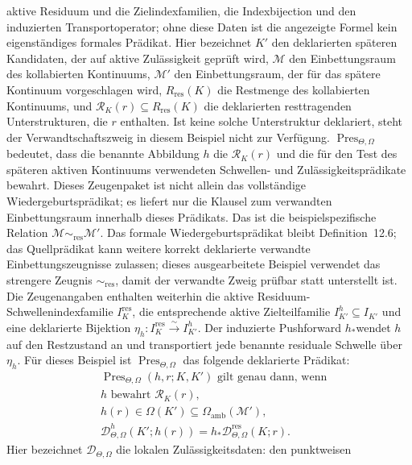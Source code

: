 aktive Residuum und die Zielindexfamilien, die Indexbijection und den induzierten Transportoperator; ohne diese
Daten ist die angezeigte Formel kein eigenständiges formales Prädikat.
Hier bezeichnet \(K'\) den deklarierten späteren Kandidaten, der auf aktive Zulässigkeit geprüft wird,
\(\mathcal{M}\) den Einbettungsraum des kollabierten Kontinuums,
\(\mathcal{M}'\) den Einbettungsraum, der für das spätere Kontinuum vorgeschlagen wird,
\(R_{\mathrm{res}}(K)\) die Restmenge des kollabierten Kontinuums, und
\(\mathcal{R}_K(r)\subseteq R_{\mathrm{res}}(K)\) die deklarierten resttragenden Unterstrukturen, die
\(r\) enthalten. Ist keine solche Unterstruktur deklariert, steht der Verwandtschaftszweig in diesem
Beispiel nicht zur Verfügung.
\(\operatorname{Pres}_{\Theta,\Omega}\) bedeutet, dass die benannte Abbildung \(h\) die
\(\mathcal{R}_K(r)\) und die für den Test des späteren aktiven Kontinuums verwendeten Schwellen- und
Zulässigkeitsprädikate bewahrt. Dieses Zeugenpaket ist nicht allein das vollständige Wiedergeburtsprädikat;
es liefert nur die Klausel zum verwandten Einbettungsraum innerhalb dieses Prädikats. Das ist die
beispielspezifische Relation
\(\mathcal{M}\sim_{\mathrm{res}}\mathcal{M}'\). Das formale Wiedergeburtsprädikat bleibt
Definition~12.6; das Quellprädikat kann weitere korrekt deklarierte verwandte Einbettungszeugnisse
zulassen; dieses ausgearbeitete Beispiel verwendet das strengere Zeugnis \(\sim_{\mathrm{res}}\), damit der
verwandte Zweig prüfbar statt unterstellt ist.
Die Zeugenangaben enthalten weiterhin die aktive Residuum-Schwellenindexfamilie
\(I_K^{\mathrm{res}}\), die entsprechende aktive Zielteilfamilie
\(I_{K'}^{h}\subseteq I_{K'}\) und eine deklarierte Bijektion
\(\eta_h:I_K^{\mathrm{res}}\xrightarrow{\sim}I_{K'}^{h}\). Der induzierte Pushforward \(h_\ast\)wendet
\(h\) auf den Restzustand an und transportiert jede benannte residuale Schwelle über \(\eta_h\).
Für dieses Beispiel ist \(\operatorname{Pres}_{\Theta,\Omega}\) das folgende deklarierte Prädikat:
\[
\begin{aligned}
&\operatorname{Pres}_{\Theta,\Omega}(h,r;K,K')
  \text{ gilt genau dann, wenn}\\
&h \text{ bewahrt } \mathcal{R}_K(r),\\
&h(r)\in\Omega(K')\subseteq\Omega_{\mathrm{amb}}(\mathcal{M}'),\\
&\mathcal{D}^{h}_{\Theta,\Omega}(K';h(r))
  =h_{\ast}\mathcal{D}^{\mathrm{res}}_{\Theta,\Omega}(K;r).
\end{aligned}
\]
Hier bezeichnet \(\mathcal{D}_{\Theta,\Omega}\) die lokalen Zulässigkeitsdaten: den punktweisen

